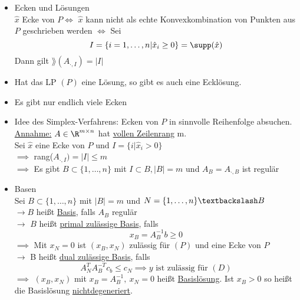\begin{itemize}
	\item Ecken und Lösungen\\
		$ \hat{x}$ Ecke von $P \iff$  $ \hat{x}$ kann nicht als echte Konvexkombination von Punkten aus $P$ geschrieben werden
		$\iff$ Sei 
		\begin{equation*}
			I = \{i = 1 ,\dots, n | \hat{x}_{i} \geq 0 \} = \supp(\hat{x})
		\end{equation*} 
		Dann gilt $\rang(A_{\cdot,I})=|I|$
	\item Hat das LP $(P)$ eine Lösung, so gibt es auch eine Ecklösung.
	\item Es gibt nur endlich viele Ecken
	\item Idee des Simplex-Verfahrens: Ecken von $P$ in sinnvolle Reihenfolge absuchen.\\
		\underline{Annahme:} $A \in \R^{m \times n }$ hat \underline{vollen Zeilenrang} m. \\
		Sei $\hat{x}$ eine Ecke von $P$ und $I = \{i | \hat{x}_{i}>0\}$ \\
		$\implies$ rang($A_{\cdot,I}   )= |I| \leq m$ \\
		$\implies$ Es gibt $B \subset \{1,\dots,n\}$ mit $I \subset B, |B| = m $ und $A_{B}= A_{\cdot,B}$ ist regulär
	\item Basen\\
		Sei $B \subset \{1,\dots,n\}$ mit $|B|=m$ und $N = \{1,\dots,n\}\textbackslash B$\\
		$\to B$ heißt \underline{Basis}, falls $A_{B}$ regulär\\
		$\to$ $B$ heißt \underline{primal zulässige Basis}, falls
		\begin{equation*}
			x_{B}=A_{B}^{-1}b \geq 0 
		\end{equation*} $\implies$ Mit $x_{N} = 0$ ist $(x_{B},x_{N})$ zulässig für $(P)$ und eine Ecke von $P$ \\
		$\to$ B heißt \underline{dual zulässige Basis}, falls 
		\begin{equation*}
			A_{N}^TA_{B}^{-T}c_{b} \leq c_{N} \implies y \text{ ist zulässig für }(D)
		\end{equation*} 
		$\implies$ $\left(x_{B},x_{N} \right)$ mit $x_{B} = A^{-1}_{B},\ x_{N}= 0$ heißt \underline{Basislösung}. Ist $x_{B} > 0 $ so heißt die Basislösung \underline{nichtdegeneriert}.
\end{itemize} 

